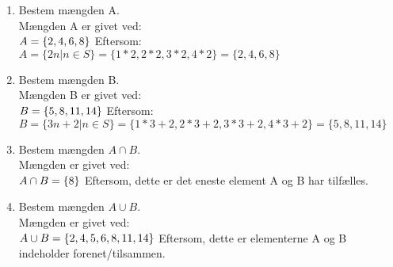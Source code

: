 \documentclass[12pt, a4paper]{article}
\begin{document}
\begin{enumerate}[label=\alph*)]
	\item {
        Bestem mængden A.\\
		Mængden A er givet ved:\\
        \begin{math}
            A = \{ 2, 4, 6, 8 \}\\
        \end{math}
            Eftersom:\\
        \begin{math}
            A = \{ 2n | n \in S \} = \{1*2, 2*2, 3*2, 4*2\} = \{2, 4, 6, 8\}
	    \end{math}
    }
 	\item {
        Bestem mængden B.\\
		Mængden B er givet ved:\\
        \begin{math}
            B = \{ 5, 8, 11, 14 \}\\
        \end{math}
            Eftersom:\\
        \begin{math}
            B = \{ 3n+2 | n \in S \} = \{1*3+2, 2*3+2, 3*3+2, 4*3+2\} = \{5, 8, 11, 14\}
	    \end{math}
    }
 	\item {
        Bestem mængden \begin{math} A \cap B \end{math}.\\
		Mængden er givet ved:\\
        \begin{math}
            A \cap B = \{8\}\\
        \end{math}
            Eftersom, dette er det eneste element A og B har tilfælles.\\
    }
    \item {
        Bestem mængden \begin{math} A \cup B \end{math}.\\
		Mængden er givet ved:\\
        \begin{math}
            A \cup B = \{2, 4, 5, 6, 8, 11, 14\}\\
        \end{math}
            Eftersom, dette er elementerne A og B indeholder forenet/tilsammen.\\
}
\end{enumerate}
\end{document}
